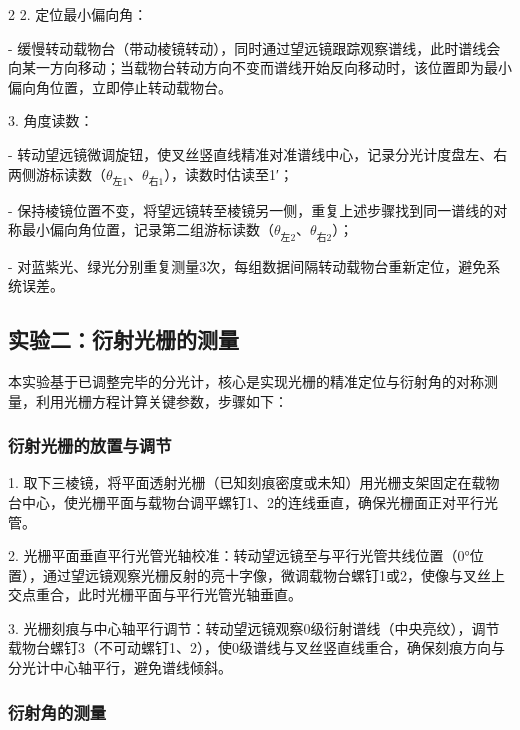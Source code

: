 \documentclass[12pt,a4paper]{article}
\begin{document}
\begin{multicols}{2}
    2. 定位最小偏向角：

       - 缓慢转动载物台（带动棱镜转动），同时通过望远镜跟踪观察谱线，此时谱线会向某一方向移动；当载物台转动方向不变而谱线开始反向移动时，该位置即为最小偏向角位置，立即停止转动载物台。

    3. 角度读数：

       - 转动望远镜微调旋钮，使叉丝竖直线精准对准谱线中心，记录分光计度盘左、右两侧游标读数（$\theta_{\text{左}1}$、$\theta_{\text{右}1}$），读数时估读至1′；

       - 保持棱镜位置不变，将望远镜转至棱镜另一侧，重复上述步骤找到同一谱线的对称最小偏向角位置，记录第二组游标读数（$\theta_{\text{左}2}$、$\theta_{\text{右}2}$）；

       - 对蓝紫光、绿光分别重复测量3次，每组数据间隔转动载物台重新定位，避免系统误差。



    \subsection{\heiti 实验二：衍射光栅的测量}

    \songti

    本实验基于已调整完毕的分光计，核心是实现光栅的精准定位与衍射角的对称测量，利用光栅方程计算关键参数，步骤如下：



    \subsubsection{\kaishu 衍射光栅的放置与调节}

    1. 取下三棱镜，将平面透射光栅（已知刻痕密度或未知）用光栅支架固定在载物台中心，使光栅平面与载物台调平螺钉1、2的连线垂直，确保光栅面正对平行光管。

    2. 光栅平面垂直平行光管光轴校准：转动望远镜至与平行光管共线位置（0°位置），通过望远镜观察光栅反射的亮十字像，微调载物台螺钉1或2，使像与叉丝上交点重合，此时光栅平面与平行光管光轴垂直。

    3. 光栅刻痕与中心轴平行调节：转动望远镜观察0级衍射谱线（中央亮纹），调节载物台螺钉3（不可动螺钉1、2），使0级谱线与叉丝竖直线重合，确保刻痕方向与分光计中心轴平行，避免谱线倾斜。



    \subsubsection{\kaishu 衍射角的测量}


\end{multicols}
\end{document}
